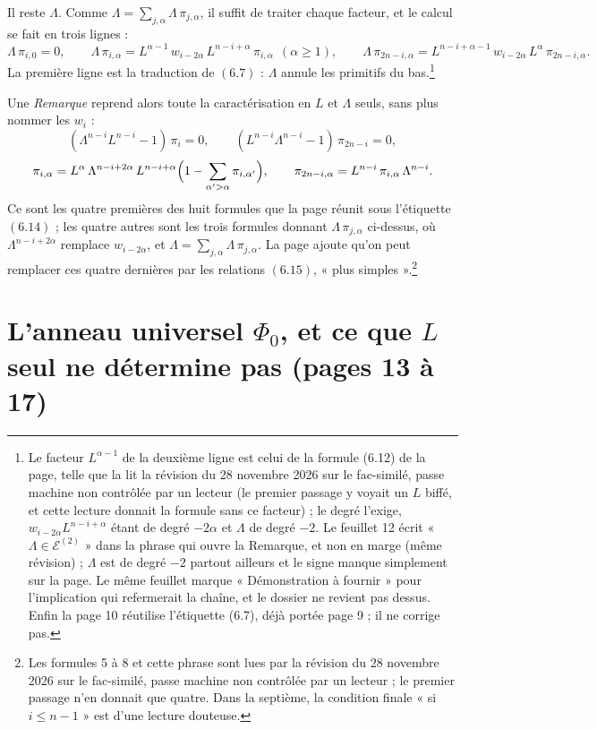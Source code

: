 \documentclass[11pt,a4paper]{article}
\begin{document}
Il reste $\Lambda$. Comme $\Lambda = \sum_{j,\alpha} \Lambda\,\pi_{j,\alpha}$,
il suffit de traiter chaque facteur, et le calcul se fait en trois lignes :
\[
\Lambda\,\pi_{i,0} = 0,
\qquad
\Lambda\,\pi_{i,\alpha} = L^{\alpha-1}\,w_{i-2\alpha}\,L^{n-i+\alpha}\,\pi_{i,\alpha}
\ \ (\alpha \geqslant 1),
\qquad
\Lambda\,\pi_{2n-i,\alpha} = L^{n-i+\alpha-1}\,w_{i-2\alpha}\,L^{\alpha}\,\pi_{2n-i,\alpha} .
\]
La première ligne est la traduction de $(6.7)$ : $\Lambda$ annule les
primitifs du bas.\footnote{Le facteur $L^{\alpha-1}$ de la deuxième ligne est
celui de la formule (6.12) de la page, telle que la lit la révision du 28 novembre 2026 sur le fac-similé, passe machine non contrôlée par un lecteur (le premier
passage y voyait un $L$ biffé, et cette lecture donnait la formule sans ce
facteur) ; le degré l'exige, $w_{i-2\alpha}L^{n-i+\alpha}$ étant de degré
$-2\alpha$ et $\Lambda$ de degré $-2$. Le feuillet 12 écrit « $\Lambda \in
\mathcal{E}^{(2)}$ » dans la phrase qui ouvre la Remarque, et non en marge
(même révision) ; $\Lambda$ est de degré $-2$ partout ailleurs et le
signe manque simplement sur la page. Le même feuillet marque « Démonstration à
fournir » pour l'implication qui refermerait la chaîne, et le dossier ne
revient pas dessus. Enfin la page 10 réutilise l'étiquette (6.7), déjà portée
page 9 ; il ne corrige pas.}

Une \emph{Remarque} reprend alors toute la caractérisation en $L$ et $\Lambda$
seuls, sans plus nommer les $w_{i}$ :
\[
(\Lambda^{n-i}L^{n-i} - 1)\,\pi_{i} = 0,
\qquad
(L^{n-i}\Lambda^{n-i} - 1)\,\pi_{2n-i} = 0,
\]
\[
\pi_{i,\alpha} = L^{\alpha}\,\Lambda^{n-i+2\alpha}\,L^{n-i+\alpha}
\Bigl(1 - \sum_{\alpha' > \alpha}\pi_{i,\alpha'}\Bigr),
\qquad
\pi_{2n-i,\alpha} = L^{n-i}\,\pi_{i,\alpha}\,\Lambda^{n-i} .
\]
Ce sont les quatre premières des huit formules que la page réunit sous
l'étiquette $(6.14)$ ; les quatre autres sont les trois formules donnant
$\Lambda\,\pi_{j,\alpha}$ ci-dessus, où $\Lambda^{n-i+2\alpha}$ remplace
$w_{i-2\alpha}$, et $\Lambda = \sum_{j,\alpha}\Lambda\,\pi_{j,\alpha}$. La page
ajoute qu'on peut remplacer ces quatre dernières par les relations $(6.15)$,
« plus simples ».\footnote{Les formules 5 à 8 et cette phrase sont lues par la
révision du 28 novembre 2026 sur le fac-similé, passe machine non contrôlée par un lecteur ; le premier passage n'en donnait que quatre. Dans la septième, la
condition finale « si $i \leqslant n-1$ » est d'une lecture douteuse.}

\section*{L'anneau universel $\Phi_{0}$, et ce que $L$ seul ne détermine pas (pages 13 à 17)}
\end{document}
